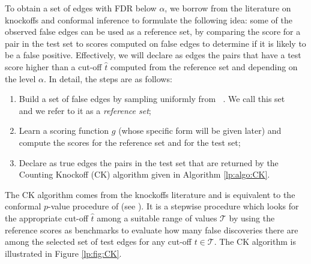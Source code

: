 \documentclass[a4paper, 11pt]{article}
\theoremstyle{remark}
\DeclareMathOperator{\Dcal}{\cD_{\text{cal}}}
\DeclareMathOperator{\Dtest}{\cD_{\text{test}}}
\DeclareMathOperator{\DtrNull}{\cD^0_{\text{train}}}
\newcommand{\EM}{\ensuremath}
\newcommand{\cD}{\EM{\mathcal{D}}}
\newcommand{\cT}{\EM{\mathcal{T}}}
\begin{document}
To obtain a set of edges with FDR below $\alpha$, we borrow from the literature on knockoffs and conformal inference \citep{weinstein2017power, bates2023testing} to formulate the following idea: some of the observed false edges can be used as a reference set, %
by comparing the score for a pair in the test set to scores computed on false edges to determine if it is likely to be a false positive. 
%
Effectively, we will declare as edges the pairs that have a test score higher than a cut-off $\hat t$ computed from the reference set and depending on the level $\alpha$. In detail, the steps are as follows:
\begin{enumerate}
\item Build a set of false edges by sampling uniformly from $\DtrNull$. We call this set $\Dcal$ and we refer to it as a \textit{reference set};%

\item Learn a scoring function $g$ (whose specific form will be given later) and compute the scores for the reference set and for the test set;%

\item Declare as true edges the pairs in the test set that are returned by the Counting Knockoff (CK) algorithm \citep{weinstein2017power} given in Algorithm \ref{lp:algo:CK}. 
\end{enumerate}
The CK algorithm \citep{weinstein2017power} comes from the knockoffs literature and is equivalent to the conformal $p$-value procedure of \cite{bates2023testing} (see \citealp{mary2022semi}). 
It is a stepwise procedure which looks for the appropriate cut-off $\hat t$ among a suitable range of values $\cT$ by using the reference scores as benchmarks to evaluate how many false discoveries there are among the selected set of test edges for any cut-off $t \in \cT$. The CK algorithm is illustrated in Figure \ref{lp:fig:CK}.
\end{document}
